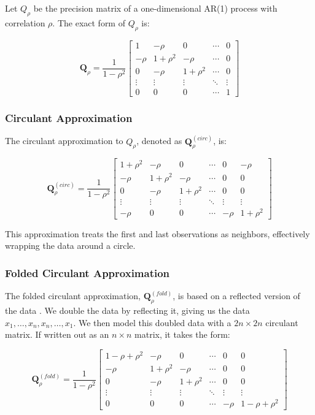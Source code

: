 \documentclass[
  12pt]{article}
\begin{document}
Let \(Q_{\rho}\) be the precision matrix of a one-dimensional AR(1)
process with correlation \(\rho\). The exact form of \(Q_{\rho}\) is:

\[
\mathbf{Q}_\rho = \frac{1}{1-\rho^2}
\begin{bmatrix}
1 & -\rho & 0 & \cdots & 0 \\
-\rho & 1+\rho^2 & -\rho & \cdots & 0 \\
0 & -\rho & 1+\rho^2 & \cdots & 0 \\
\vdots & \vdots & \vdots & \ddots & \vdots \\
0 & 0 & 0 & \cdots & 1
\end{bmatrix}
\]

\subsubsection{Circulant Approximation}\label{circulant-approximation}

The circulant approximation to \(Q_\rho\), denoted as
\(\mathbf{Q}_\rho^{(circ)}\), is:

\[
\mathbf{Q}_\rho^{(circ)} = \frac{1}{1-\rho^2}
\begin{bmatrix}
1+\rho^2 & -\rho & 0 & \cdots & 0 & -\rho \\
-\rho & 1+\rho^2 & -\rho & \cdots & 0 & 0 \\
0 & -\rho & 1+\rho^2 & \cdots & 0 & 0 \\
\vdots & \vdots & \vdots & \ddots & \vdots & \vdots \\
-\rho & 0 & 0 & \cdots & -\rho & 1+\rho^2
\end{bmatrix}
\]

This approximation treats the first and last observations as neighbors,
effectively wrapping the data around a circle.

\subsubsection{Folded Circulant
Approximation}\label{folded-circulant-approximation}

The folded circulant approximation, \(\mathbf{Q}_\rho^{(fold)}\), is
based on a reflected version of the data
\citep{kent2022, mondal2018, besag2005}. We double the data by
reflecting it, giving us the data \(x_1,  \dots, x_n, x_n, \dots, x_1\).
We then model this doubled data with a \(2n \times 2n\) circulant
matrix. If written out as an \(n \times n\) matrix, it takes the form:

\[
\mathbf{Q}_\rho^{(fold)} = \frac{1}{1-\rho^2}
\begin{bmatrix}
1-\rho+\rho^2 & -\rho & 0 & \cdots & 0 & 0 \\
-\rho & 1+\rho^2 & -\rho & \cdots & 0 & 0 \\
0 & -\rho & 1+\rho^2 & \cdots & 0 & 0 \\
\vdots & \vdots & \vdots & \ddots & \vdots & \vdots \\
0 & 0 & 0 & \cdots & -\rho & 1-\rho+\rho^2
\end{bmatrix}
\]
\end{document}
